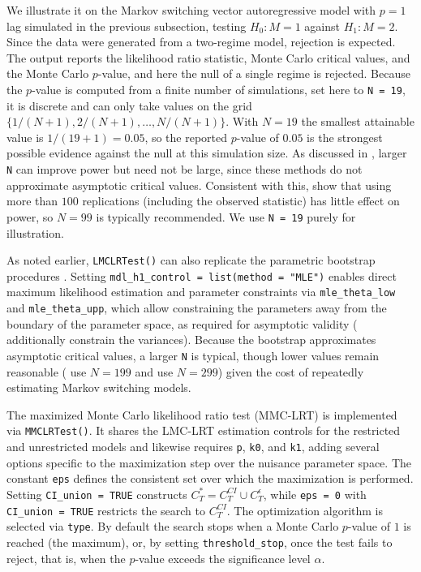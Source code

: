 We illustrate it on the Markov switching vector autoregressive model with \(p=1\) lag simulated in the previous subsection, testing \(H_0: M = 1\) against \(H_1: M = 2\). Since the data were generated from a two-regime model, rejection is expected. The output reports the likelihood ratio statistic, Monte Carlo critical values, and the Monte Carlo \(p\)-value, and here the null of a single regime is rejected. Because the \(p\)-value is computed from a finite number of simulations, set here to \texttt{N\ =\ 19}, it is discrete and can only take values on the grid \(\{1/(N+1), 2/(N+1), \ldots, N/(N+1)\}\). With \(N = 19\) the smallest attainable value is \(1/(19+1) = 0.05\), so the reported \(p\)-value of \(0.05\) is the strongest possible evidence against the null at this simulation size. As discussed in \citep{dufour2006, rodrondufour_mcmstest}, larger \texttt{N} can improve power but need not be large, since these methods do not approximate asymptotic critical values. Consistent with this, \citet{dufour2004} show that using more than \(100\) replications (including the observed statistic) has little effect on power, so \(N = 99\) is typically recommended. We use \texttt{N\ =\ 19} purely for illustration.

As noted earlier, \texttt{LMCLRTest()} can also replicate the parametric bootstrap procedures \citep{quzhuo2021likelihood, kasshi2018}. Setting \texttt{mdl\_h1\_control\ =\ list(method\ =\ "MLE")} enables direct maximum likelihood estimation and parameter constraints via \texttt{mle\_theta\_low} and \texttt{mle\_theta\_upp}, which allow constraining the parameters away from the boundary of the parameter space, as required for asymptotic validity (\citet{kasshi2018} additionally constrain the variances). Because the bootstrap approximates asymptotic critical values, a larger \texttt{N} is typical, though lower values remain reasonable (\citet{quzhuo2021likelihood} use \(N = 199\) and \citet{kasshi2018} use \(N = 299\)) given the cost of repeatedly estimating Markov switching models.

The maximized Monte Carlo likelihood ratio test (MMC-LRT) is implemented via \texttt{MMCLRTest()}. It shares the LMC-LRT estimation controls for the restricted and unrestricted models and likewise requires \texttt{p}, \texttt{k0}, and \texttt{k1}, adding several options specific to the maximization step over the nuisance parameter space. The constant \texttt{eps} defines the consistent set over which the maximization is performed. Setting \texttt{CI\_union\ =\ TRUE} constructs \(C_T^\ast = C_T^{CI} \cup C_T^{\epsilon}\), while \texttt{eps\ =\ 0} with \texttt{CI\_union\ =\ TRUE} restricts the search to \(C_T^{CI}\). The optimization algorithm is selected via \texttt{type}. By default the search stops when a Monte Carlo \(p\)-value of \(1\) is reached (the maximum), or, by setting \texttt{threshold\_stop}, once the test fails to reject, that is, when the \(p\)-value exceeds the significance level \(\alpha\).

